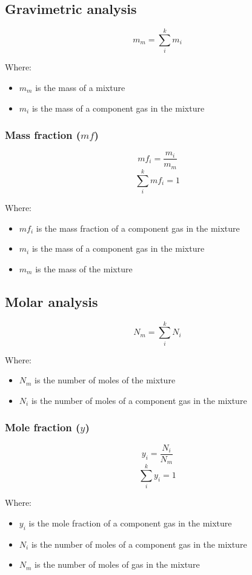 \documentclass[11pt]{article}
\begin{document}
\subsection{Gravimetric analysis}
\label{sec:orgb51bb75}
\[m_m = \sum_i^k m_i\]

Where:
\begin{itemize}
\item \(m_m\) is the mass of a mixture
\item \(m_i\) is the mass of a component gas in the mixture
\end{itemize}

\subsubsection{Mass fraction (\(mf\))}
\label{sec:orge358b74}
\[mf_i = \frac{m_i}{m_m}\]
\[\sum_i^k mf_i = 1\]

Where:
\begin{itemize}
\item \(mf_i\) is the mass fraction of a component gas in the mixture
\item \(m_i\) is the mass of a component gas in the mixture
\item \(m_m\) is the mass of the mixture
\end{itemize}

\subsection{Molar analysis}
\label{sec:org27b2249}
\[N_m = \sum_i^k N_i\]

Where:
\begin{itemize}
\item \(N_m\) is the number of moles of the mixture
\item \(N_i\) is the number of moles of a component gas in the mixture
\end{itemize}

 \newpage

\subsubsection{Mole fraction (\(y\))}
\label{sec:orgf0d0c53}
\[y_i = \frac{N_i}{N_m}\]
\[\sum_i^k y_i = 1\]

Where:
\begin{itemize}
\item \(y_i\) is the mole fraction of a component gas in the mixture
\item \(N_i\) is the number of moles of a component gas in the mixture
\item \(N_m\) is the number of moles of gas in the mixture
\end{itemize}
\end{document}
